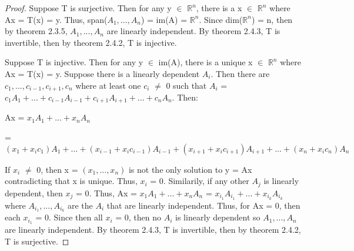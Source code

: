     \begin{proof}
        Suppose T is surjective.
        Then for any y $\in$ $\mathbb{R}^n$,
        there is a x $\in$ $\mathbb{R}^n$ where
        Ax = T(x) = y.
        Thus, span($A_1,...,A_n$) = im(A) = $\mathbb{R}^n$.
        Since dim($\mathbb{R}^n$) = n, then by {\color{red} theorem 2.3.5},
        $A_1,...,A_n$ are linearly independent.
        By {\color{red} theorem 2.4.3}, T is invertible,
        then by {\color{red} theorem 2.4.2}, T is injective.

        \vspace{0.2cm}

        Suppose T is injective.
        Then for any y $\in$ im(A),
        there is a unique x $\in$ $\mathbb{R}^n$ where
        Ax = T(x) = y.
        Suppose there is a linearly dependent $A_i$.
        Then there are $c_1,...,c_{i-1},c_{i+1},c_n$ where
        at least one $c_i$ $\not =$ 0 such that
        $A_i$ = $c_1A_1 + ... + c_{i-1}A_{i-1} + c_{i+1}A_{i+1} + ... + c_nA_n$.
        Then:

        \hspace{0.5cm}
        Ax
        = $x_1A_1 + ... + x_nA_n$

        \hspace{1.15cm}
        = $(x_1 + x_ic_1)A_1 + ... + (x_{i-1} + x_ic_{i-1})A_{i-1}
            + (x_{i+1} + x_ic_{i+1})A_{i+1} + ... + (x_n + x_ic_n)A_n$

        If $x_i$ $\not =$ 0, then x = $(x_1,...,x_n)$
        is not the only solution to y = Ax contradicting that x is unique.
        Thus, $x_i$ = 0. Similarily, if any other $A_j$ is linearly dependent,
        then $x_j$ = 0. Thus, Ax = $x_1A_1 + ... + x_nA_n$
        = $x_{i_1}A_{i_1} + ... + x_{i_k}A_{i_k}$
        where $A_{i_1},...,A_{i_k}$ are the $A_i$ that are linearly independent.
        Thus, for Ax = 0, then each $x_{i_1}$ = 0.
        Since then all $x_i$ = 0, then no $A_i$ is linearly dependent
        so $A_1,...,A_n$ are linearly independent.
        By {\color{red} theorem 2.4.3}, T is invertible,
        then by {\color{red} theorem 2.4.2}, T is surjective.
    \end{proof}

    \newpage



